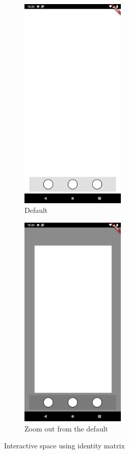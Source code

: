 \begin{figure}[b]
    \begin{subfigure}{0.4\textwidth}
        \centering
        \includegraphics[width=5cm]{Images/App/fullspace.png}
        \caption{Default}
        \label{fig:fullspace}
    \end{subfigure}
    \hfill
    \begin{subfigure}{0.4\textwidth}
        \centering
        \includegraphics[width=5cm]{Images/App/fullzoom.png}
        \caption{Zoom out from the default}
        \label{fig:fullzoom}
    \end{subfigure}
    \caption{Interactive space using identity matrix}
    \label{fig:defaultspace}
\end{figure}

